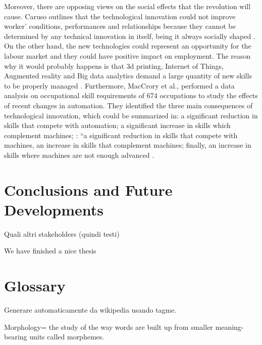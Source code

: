 \documentclass[]{book}
\begin{document}
Moreover, there are opposing views on the social effects that the
revolution will cause. Caruso outlines that the technological innovation
could not improve worker' conditions, performances and relationships
because they cannot be determined by any technical innovation in itself,
being it always socially shaped \citep{caruso2017digital}. On the other
hand, the new technologies could represent an opportunity for the labour
market and they could have positive impact on employment. The reason why
it would probably happens is that 3d printing, Internet of Things,
Augmented reality and Big data analytics demand a large quantity of new
skills to be properly managed \citep{freddi2017digitalisation}.
Furthermore, MacCrory et al., performed a data analysis on occupational
skill requirements of 674 occupations to study the effects of recent
changes in automation. They identified the three main consequences of
technological innovation, which could be summarized in: a significant
reduction in skills that compete with automation; a significant increase
in skills which complement machines; : ``a significant reduction in
skills that compete with machines, an increase in skills that complement
machines; finally, an increase in skills where machines are not enough
advanced \citep{maccrory2014racing}.

\chapter*{Conclusions and Future
Developments}\label{conclusions-and-future-developments}

Quali altri stakeholders (quindi testi)

We have finished a nice thesis

\chapter*{Glossary}\label{glossary}

Generare automaticamente da wikipedia usando tagme.

Morphology= the study of the way words are built up from smaller
meaning-bearing units called morphemes.


\end{document}
